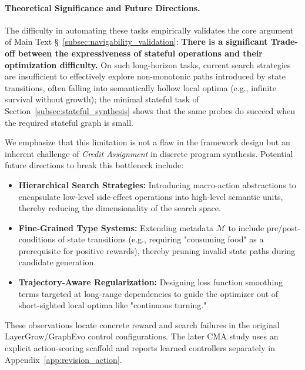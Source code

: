\paragraph{Theoretical Significance and Future Directions.}
The difficulty in automating these tasks empirically validates the core argument of Main Text §~\ref{subsec:navigability_validation}: \textbf{There is a significant Trade-off between the expressiveness of stateful operations and their optimization difficulty.} On such long-horizon tasks, current search strategies are insufficient to effectively explore non-monotonic paths introduced by state transitions, often falling into semantically hollow local optima (e.g., infinite survival without growth); the minimal stateful task of Section~\ref{subsec:stateful_synthesis} shows that the same probes do succeed when the required stateful graph is small.

We emphasize that this limitation is not a flaw in the framework design but an inherent challenge of \textit{Credit Assignment} in discrete program synthesis. Potential future directions to break this bottleneck include:
\begin{itemize}
    \item \textbf{Hierarchical Search Strategies:} Introducing macro-action abstractions to encapsulate low-level side-effect operations into high-level semantic units, thereby reducing the dimensionality of the search space.
    \item \textbf{Fine-Grained Type Systems:} Extending metadata $\mathcal{M}$ to include pre/post-conditions of state transitions (e.g., requiring "consuming food" as a prerequisite for positive rewards), thereby pruning invalid state paths during candidate generation.
    \item \textbf{Trajectory-Aware Regularization:} Designing loss function smoothing terms targeted at long-range dependencies to guide the optimizer out of short-sighted local optima like "continuous turning."
\end{itemize}

These observations locate concrete reward and search failures in the original LayerGrow/GraphEvo control configurations. The later CMA study uses an explicit action-scoring scaffold and reports learned controllers separately in Appendix~\ref{app:revision_action}.



